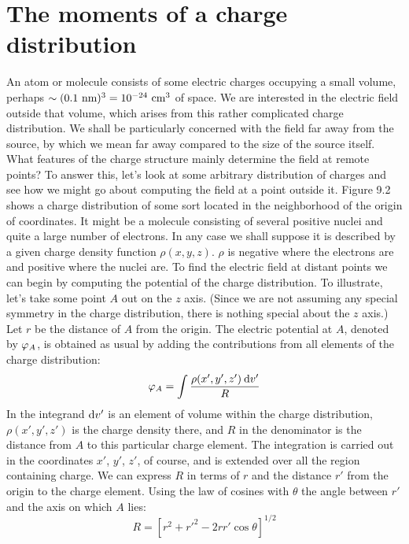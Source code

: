 \section{The moments of a charge distribution}

An atom or molecule consists of some electric charges occupying
a small volume, perhaps \linebreak[4]$\sim (0.1\ \zu{nm})^3=10^{-24}\ \cmunit^3$ of space.
We are interested in the electric field outside that volume, which
arises from this rather complicated charge distribution. We shall
be particularly concerned with the field far away from the source,
by which we mean far away compared to the size of the source itself.
What features of the charge structure mainly determine the field at
remote points? To answer this, let's look at some arbitrary distribution
of charges and see how we might go about computing the field
at a point outside it. Figure 9.2 shows a charge distribution of some
sort located in the neighborhood of the origin of coordinates. It
might be a molecule consisting of several positive nuclei and quite
a large number of electrons. In any case we shall suppose it is described
by a given charge density function $\rho(x,y,z)$. $\rho$ is negative
where the electrons are and positive where the nuclei are. To find
the electric field at distant points we can begin by computing the
potential of the charge distribution. To illustrate, let's take some
point $A$ out on the $z$ axis. (Since we are not assuming any special
symmetry in the charge distribution, there is nothing special about
the $z$ axis.) Let $r$ be the distance of $A$ from the origin. The electric
potential at $A$, denoted by $\varphi_A$, is obtained as usual by adding the
contributions from all elements of the charge distribution:
\begin{equation}
  \varphi_A = \int \frac{\rho(x',y',z')\:\textup{d} v'}{R}
\end{equation}
In the integrand $\textup{d} v'$ is an element of volume within the charge 
distribution, $\rho(x',y',z')$ is the charge density there, and $R$ in the denominator
is the distance from $A$ to this particular charge element. The
integration is carried out in the coordinates $x'$, $y'$, $z'$, of course, and
is extended over all the region containing charge. We can express $R$
in terms of $r$ and the distance $r'$ from the origin to the charge element.
Using the law of cosines with $\theta$ the angle between $r'$ and the axis on
which $A$ lies:
\begin{equation}
  R = [r^2 + r'^2 - 2rr'\cos\theta]^{1/2}
\end{equation}
